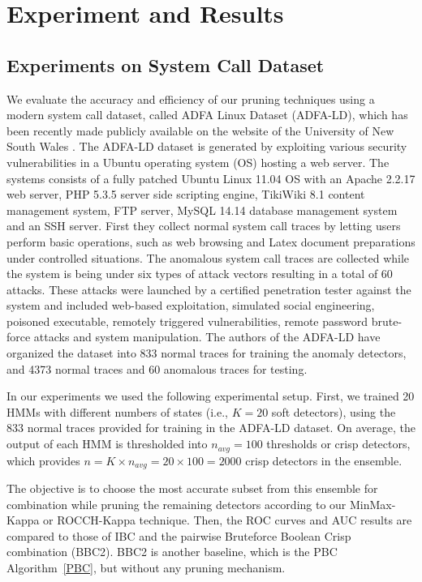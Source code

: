 \chapter{Experiment and Results} \label{chapter4}

\section{Experiments on System Call Dataset}
\label{sec:experiments}

We evaluate the accuracy and efficiency of our pruning techniques using a modern system call dataset, called ADFA Linux Dataset (ADFA-LD), which has been recently made publicly available on the website of the University of New South Wales \cite{Creech2013a}.
The ADFA-LD dataset is generated by exploiting various security vulnerabilities in a Ubuntu operating system (OS) hosting a web server.
The systems consists of a fully patched Ubuntu Linux 11.04 OS with an Apache 2.2.17 web server, PHP 5.3.5 server side scripting engine, TikiWiki 8.1 content management system, FTP server, MySQL 14.14 database management system and an SSH server.
First they collect normal system call traces by letting users perform basic operations, such as web browsing and Latex document preparations under controlled situations.
The anomalous system call traces are collected while the system is being under six types of attack vectors resulting in a total of 60 attacks.
These attacks were launched by a certified penetration tester against the system and included web-based exploitation, simulated social engineering, poisoned executable, remotely triggered vulnerabilities, remote password brute-force attacks and system manipulation.
The authors of the ADFA-LD have organized the dataset into 833 normal traces for training the anomaly detectors, and 4373 normal traces and 60 anomalous traces for testing.

In our experiments we used the following experimental setup.
First, we trained 20 HMMs with different numbers of states (i.e., $K=20$ soft detectors), using the 833 normal traces provided for training in the ADFA-LD dataset.
On average, the output of each HMM is thresholded into $n_{avg} = 100$ thresholds or crisp detectors, which provides $n = K \times n_{avg} = 20\times 100 =2000$ crisp detectors in the ensemble.

The objective is to choose the most accurate subset from this ensemble for combination while pruning the remaining detectors according to our MinMax-Kappa or ROCCH-Kappa technique.
Then, the ROC curves and AUC results are compared to those of IBC and the pairwise Bruteforce Boolean Crisp combination (BBC2).
BBC2 is another baseline, which is the PBC Algorithm~\ref{PBC}, but without any pruning mechanism.


